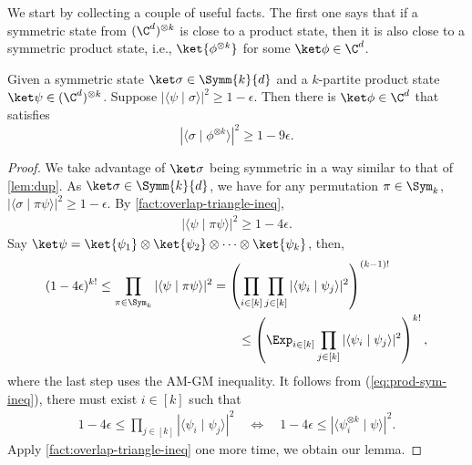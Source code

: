 We start by collecting a couple of useful facts. The first one says that if a symmetric state from $(\C^d)^{\otimes k}$ is close to a product state, then it is also close to a symmetric product state, i.e., $\ket{\phi^{\otimes k}}$ for some $\ket\phi \in \C ^d$.
\begin{lemma} \label{lem:prod-symmetric-state}
Given a symmetric state $\ket\sigma\in\Symm{k}{d}$ and a $k$-partite product state $\ket\psi\in (\C^d)^{\otimes k}$. Suppose $|\langle \psi \mid \sigma \rangle|^2 \ge 1-\epsilon$. Then there is $\ket\phi\in\C^d$ that satisfies
\[
    |\langle\sigma\mid \phi^{\otimes k}\rangle|^2 \ge 
    1-9\epsilon.
\]
\end{lemma}
\begin{proof}
We take advantage of $\ket\sigma$ being symmetric in a way similar to that of \cref{lem:dup}. As $\ket\sigma\in\Symm{k}{d}$, we have for any permutation $\pi\in \Sym_k$, $|\langle \sigma \mid \pi\psi\rangle|^2\ge1-\epsilon$. By \cref{fact:overlap-triangle-ineq},
\begin{align*}
    |\langle \psi \mid \pi\psi \rangle|^2 \ge 1-4\epsilon.
\end{align*}
Say $\ket\psi=\ket{\psi_1}\otimes\ket{\psi_2}\otimes \cdots \otimes\ket{\psi_k}$, then,
\begin{align}
    (1-4\epsilon)^{k!} 
    \le \prod_{\pi\in \Sym_k} |\langle \psi \mid \pi\psi \rangle|^2    
    &=\left(\prod_{i\in[k]}\prod_{j \in [k]} |\langle \psi_i\mid \psi_j\rangle|^2\right)^{(k-1)!}
        \nonumber\\
    &\qquad\le \left(\Exp_{i\in[k]} \prod_{j\in[k]}
    |\langle \psi_i\mid \psi_j\rangle|^2\right)^{k!},
        \label{eq:prod-sym-ineq}
\end{align}
where the last step uses the AM-GM inequality. It follows from (\ref{eq:prod-sym-ineq}), there must exist $i\in[k]$ such that
\begin{align}
     1-4\epsilon\le \prod_{j\in [k]} |\langle \psi_i \mid \psi_j \rangle|^2 
         \quad \iff \quad
     1-4\epsilon \le |\langle  \psi_i ^{\otimes k} \mid \psi \rangle|^2.
     \nonumber
\end{align}
Apply \cref{fact:overlap-triangle-ineq} one more time, we obtain our lemma.
\end{proof}


